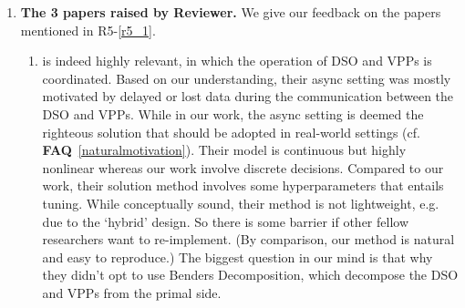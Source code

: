 \documentclass[11pt]{article}
\newcommand{\faq}[1]{\textbf{FAQ}~\ref{#1}}
\begin{document}
\begin{enumerate}
    \par What's more, \begin{enumerate}
        \item We've conducted a comparison with the centralized method in our paper (that staircase curve, which used 1-thread sequential programming).
        \item We don't think it is meaningful to compare with a parallel-programming with sync-point
        existing in each master's re-optimization.
        As mentioned in \faq{naturalmotivation}, adding a sync-point for all blocks is counter-natural (or say, just won't be adopted in practice).
        The proper mindset of scientific study is---we first accept a theory as plausible, then we
        do experiments.
        \item We are not aware of a `state-of-the-art distributed asynchronous algorithm' that deserves
        comparison (Also cf. \faq{notadmm} and cf. \faq{asynccode}).
    \end{enumerate}
    We've mentioned in \faq{naturalmotivation} that our method is already a standard one (at least we think).
    In fact, we believe that our method can serve as a baseline method for any future work to
    compare with. Note that we've made our code available \faq{code}.
    \item \textbf{The 3 papers raised by Reviewer.} \label{admmpapers}
    We give our feedback on the papers mentioned in R5-\ref{r5_1}.
    \begin{enumerate}
        \item \cite{wang2023} is indeed highly relevant, in which the operation of DSO and VPPs is coordinated. Based on our understanding, their async setting was mostly motivated by delayed or lost data during the communication between the DSO and VPPs.
        While in our work, the async setting is deemed the righteous solution that should be adopted in real-world settings (cf. \faq{naturalmotivation}).
        Their model is continuous but highly nonlinear whereas our work involve discrete decisions.
        Compared to our work, their solution method involves some hyperparameters that entails tuning.
        While conceptually sound, their method is not lightweight, e.g. due to the `hybrid' design.
        So there is some barrier if other fellow researchers want to re-implement. (By comparison, our method is natural and easy to reproduce.)
        The biggest question in our mind is that why they didn't opt to use Benders Decomposition,
        which decompose the DSO and VPPs from the primal side.

\end{enumerate}
\end{enumerate}
\end{document}
